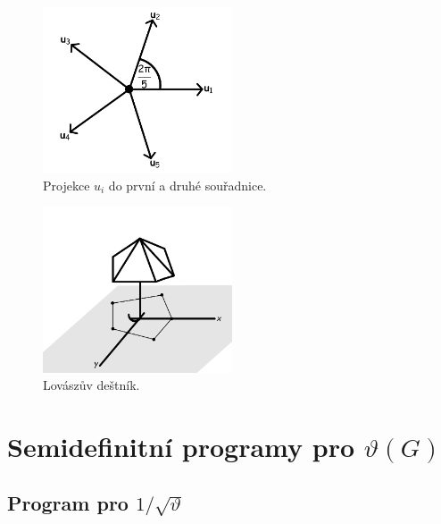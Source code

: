\begin{figure}[h!]
    \centering
    \includegraphics[width=0.5\textwidth]{img/umbrella_projection.png} 
    \caption{Projekce $u_i$ do první a druhé souřadnice.}
    \label{fig:umbrella_projection}
\end{figure}

\begin{figure}[h!]
    \centering
    \includegraphics[width=0.5\textwidth]{img/umbrella.png} 
    \caption{Lovászův deštník.}
    \label{fig:umbrella}
\end{figure}


\section{Semidefinitní programy pro $\vartheta(G)$}

\subsection*{Program pro $1/\sqrt{\vartheta}$}

